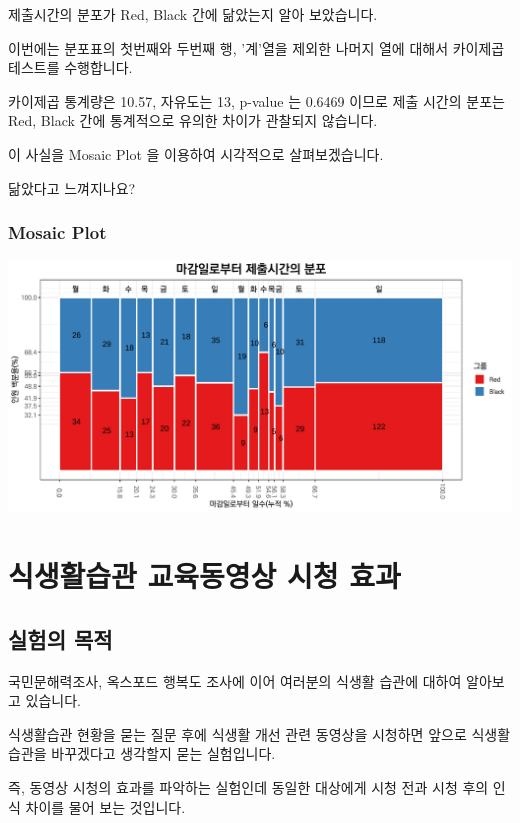 \documentclass[
]{book}
\begin{document}
제출시간의 분포가 Red, Black 간에 닮았는지 알아 보았습니다.

이번에는 분포표의 첫번째와 두번째 행, '계'열을 제외한 나머지 열에 대해서 카이제곱테스트를 수행합니다.

카이제곱 통계량은 10.57, 자유도는 13, p-value 는 0.6469 이므로 제출 시간의 분포는 Red, Black 간에 통계적으로 유의한 차이가 관찰되지 않습니다.

이 사실을 Mosaic Plot 을 이용하여 시각적으로 살펴보겠습니다.

닮았다고 느껴지나요?

\subsection{Mosaic Plot}\label{mosaic-plot-24}

\includegraphics{Quiz_report_2025_files/figure-latex/unnamed-chunk-308-1.pdf}

\chapter{식생활습관 교육동영상 시청 효과}\label{uxc2dduxc0dduxd65cuxc2b5uxad00-uxad50uxc721uxb3d9uxc601uxc0c1-uxc2dcuxccad-uxd6a8uxacfc}

\section{실험의 목적}\label{uxc2e4uxd5d8uxc758-uxbaa9uxc801-11}

국민문해력조사, 옥스포드 행복도 조사에 이어 여러분의 식생활 습관에 대하여 알아보고 있습니다.

식생활습관 현황을 묻는 질문 후에 식생활 개선 관련 동영상을 시청하면 앞으로 식생활습관을 바꾸겠다고 생각할지 묻는 실험입니다.

즉, 동영상 시청의 효과를 파악하는 실험인데 동일한 대상에게 시청 전과 시청 후의 인식 차이를 물어 보는 것입니다.
\end{document}
